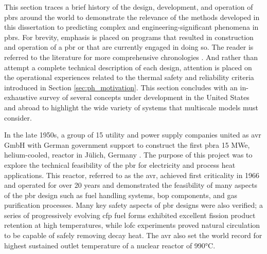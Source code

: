 This section traces a brief history of the design, development, and operation of \glspl{pbr} around the world to demonstrate the relevance of the methods developed in this dissertation to predicting complex and engineering-significant phenomena in \glspl{pbr}. For brevity, emphasis is placed on programs that resulted in construction and operation of a \gls{pbr} or that are currently engaged in doing so. The reader is referred to the literature for more comprehensive chronologies \cite{claxton,thomas}. And rather than attempt a complete technical description of each design, attention is placed on the operational experiences related to the thermal safety and reliability criteria introduced in Section \ref{sec:ph_motivation}. This section concludes with an in-exhaustive survey of several concepts under development in the United States and abroad to highlight the wide variety of systems that multiscale models must consider.

In the late 1950s, a group of 15 utility and power supply companies united as \gls{avr} GmbH with German government support to construct the first \gls{pbr}\mdash a 15 MWe, helium-cooled, reactor in J{\"u}lich, Germany \cite{hecker,oehme,nrc_avr,moormann}. The purpose of this project was to explore the technical feasibility of the \gls{pbr} for electricity and process heat applications. This reactor, referred to as the \gls{avr}, achieved first criticality in 1966 and operated for over 20 years and demonstrated the feasibility of many aspects of the \gls{pbr} design such as fuel handling systems, \gls{bop} components, and gas purification processes. Many key safety aspects of \gls{pbr} designs were also verified; a series of progressively evolving \gls{cfp} fuel forms exhibited excellent fission product retention at high temperatures, while \gls{lofc} experiments proved natural circulation to be capable of safely removing decay heat. The \gls{avr} also set the world record for highest sustained outlet temperature of a nuclear reactor of 990\si{\celsius}.

